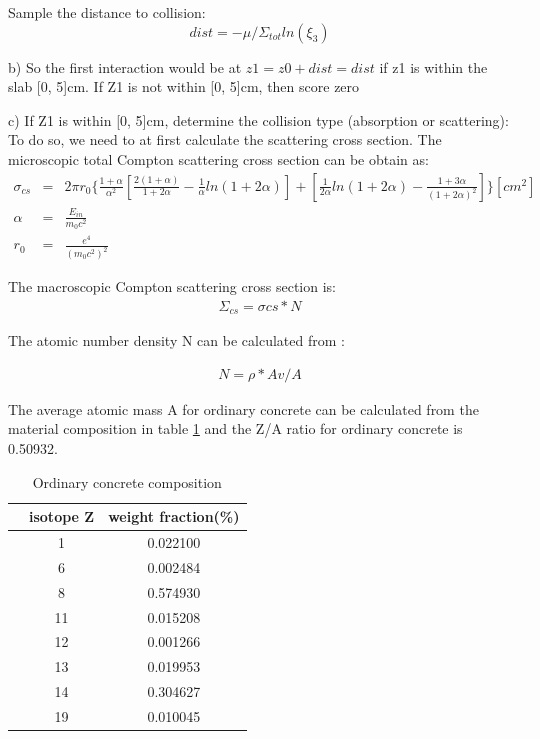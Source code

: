 \documentclass[paper=a4, fontsize=11pt]{article} %
\newcommand{\ra}[1]{\renewcommand{\arraystretch}{#1}}
\begin{document}
Sample the distance to collision:
\begin{equation}
dist = -\mu/\Sigma_{tot} ln(\xi_3)
\end{equation}

b) So the first interaction would be at $z1 = z0 + dist = dist$ if z1 is within the slab [0, 5]cm. If Z1 is not within [0, 5]cm, then score zero

c) If Z1 is within [0, 5]cm, determine the collision type (absorption or scattering):
To do so, we need to at first calculate the scattering cross section. The microscopic total Compton scattering cross section can be obtain as:
\begin{eqnarray}
\sigma _{cs} &=& 2 \pi r_0 \{ \frac{1+\alpha} {\alpha ^2} [\frac{2(1+\alpha)}{1+2\alpha} - \frac{1}{\alpha} ln(1+2\alpha)] + [\frac{1}{2\alpha} ln(1+2\alpha) - \frac{1+3\alpha}{(1+2\alpha)^2}] \} [cm^2] \nonumber\\
\alpha &=& \frac{E_{in}}{m_0 c^2} \nonumber\\
r_0 &=& \frac{e^4}{(m_0 c^2)^2}
\end{eqnarray}

The macroscopic Compton scattering cross section is:
\begin{eqnarray}
\Sigma_{cs} = \sigma{cs} * N
\end{eqnarray}

The atomic number density N can be calculated from :

\begin{eqnarray}
N = \rho * Av/ A
\end{eqnarray}

The average atomic mass A for ordinary concrete can be calculated from the material composition in table \ref{concrete_material_composition} and the Z/A ratio for ordinary concrete is 0.50932. 

\begin{table}\centering
\ra{1.3}
\begin{tabular}{@{}ccc@{}}\toprule
    & isotope Z & weight fraction(\%) \\ \midrule
    & 1         & 0.022100 \\
    & 6         & 0.002484 \\
    & 8         & 0.574930 \\
    & 11        & 0.015208 \\
    & 12        & 0.001266 \\
    & 13        & 0.019953 \\
    & 14        & 0.304627 \\
    & 19        & 0.010045 \\
\bottomrule
\end{tabular}
\caption{Ordinary concrete composition}
\label{concrete_material_composition}
\end{table}
\end{document}
